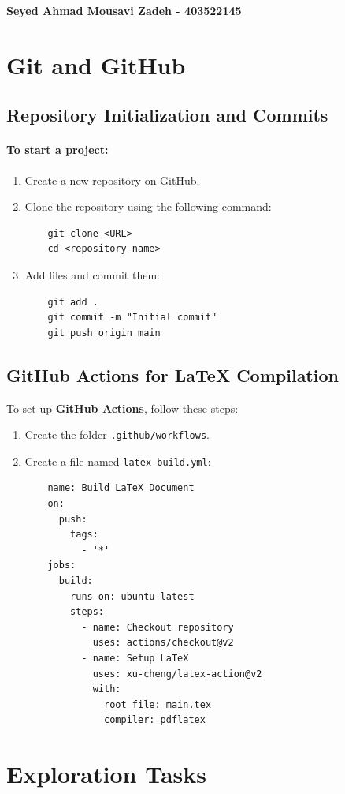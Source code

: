 \documentclass{article}
\begin{document}
\textbf{Seyed Ahmad Mousavi Zadeh - 403522145}

\section{Git and GitHub}

\subsection{Repository Initialization and Commits}
\paragraph{To start a project:}
\begin{enumerate}
    \item Create a new repository on GitHub.
    \item Clone the repository using the following command:
    \begin{verbatim}
    git clone <URL>
    cd <repository-name>
    \end{verbatim}
    \item Add files and commit them:
    \begin{verbatim}
    git add .
    git commit -m "Initial commit"
    git push origin main
    \end{verbatim}
\end{enumerate}
\subsection{GitHub Actions for LaTeX Compilation}
To set up \textbf{GitHub Actions}, follow these steps:
\begin{enumerate}
    \item Create the folder \texttt{.github/workflows}.
    \item Create a file named \texttt{latex-build.yml}:
    \begin{verbatim}
    name: Build LaTeX Document
    on:
      push:
        tags:
          - '*'
    jobs:
      build:
        runs-on: ubuntu-latest
        steps:
          - name: Checkout repository
            uses: actions/checkout@v2
          - name: Setup LaTeX
            uses: xu-cheng/latex-action@v2
            with:
              root_file: main.tex
              compiler: pdflatex
    \end{verbatim}
\end{enumerate}
\section{Exploration Tasks}
\end{document}
